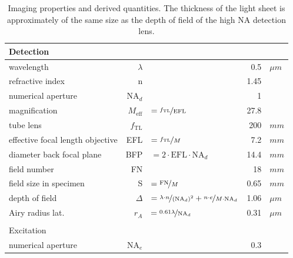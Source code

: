 \documentclass[12pt]{spieman}  %
\begin{document}
		
\begin{landscape}
\begin{table}[t!]
	\centering
		\caption[Resolution]{Imaging properties and derived quantities. The thickness of the light sheet is approximately of the same size as the depth of field of the high NA detection lens.\label{tab:resolution}}
		\begin{tabular}{lrlrl}
		\multicolumn{5}{l}{Detection}\\\hline\hline  
		wavelength																	&	$\lambda$				&																																					& 0.5			& $\mu m$	\\
		refractive index														&	n								&																																					& 1.45		& 				\\
		numerical aperture 													&	$\text{NA}_d$		&																																					& 1				& 				\\
		magnification 															& $M_{\text{eff}}$&	$= \nicefrac{f_{\text{TL}}}{\text{EFL}}$																& 27.8		&					\\
		tube lens 																	& $f_{\text{TL}}$	&																																					& 200			&	$mm$		\\
		effective focal length objective						& EFL							& $=\nicefrac{f_{\text{TL}}}{M}$																					& 7.2			& $mm$		\\
		diameter back focal plane										& BFP							& $= 2\cdot \text{EFL} \cdot \text{NA}_d$																	& 14.4		& $mm$		\\
		field number																& FN							&																																					& 18			& $mm$		\\
		field size in specimen											& S								& $=\nicefrac{\text{FN}}{M}$																							& 0.65		& $mm$		\\
		depth of field															& $\Delta$				& $=\nicefrac{\lambda \cdot n}{(\text{NA}_d)^2}+ \nicefrac{n \cdot e}{M \cdot \text{NA}_d}$	& 1.06 		& $\mu m$	\\ 
		Airy radius lat.														& $r_A$						& $=\nicefrac{0.61 \lambda}{\text{NA}_d}$																	& 0.31		& $\mu m$	\\\\
		\multicolumn{5}{l}{Excitation}\\\hline\hline
		numerical aperture 													&	$\text{NA}_e$		&																																					& 0.3			& 				\\

\end{tabular}
\end{table}
\end{landscape}
\end{document}
